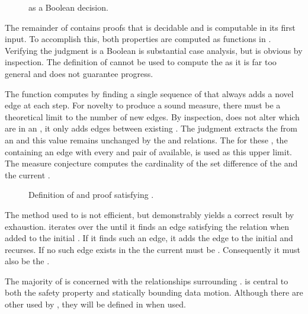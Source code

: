 \begin{figure}
  \COQDOCtransferDec{}
  \caption{\COQtransfer{} as a Boolean decision.}
\end{figure}

The remainder of \COQSequentialAccess{} contains proofs that \COQtransfer{} is decidable and \COQpotAcc{} is computable in its first input.
To accomplish this, both properties are computed as functions in \COQSet{}.
Verifying the \COQtransfer{} judgment is a Boolean is substantial case analysis, but is obvious by inspection.
The definition of \TMpotTransfer{} cannot be used to compute the \TMpotAccAG{} as it is far too general and does not guarantee progress.

The function \COQcomputePotAcc{} computes \TMpotAcc{} by finding a single sequence of \TMtransfers{} that always adds a novel edge at each step.
For novelty to produce a sound measure, there must be a theoretical limit to the number of new edges.
By inspection, \TMtransfer{} does not alter which \TMrefs{} are in an \TMaccessGraph{}, it only adds edges between existing \TMrefs{}.
The \COQagObjsSpec{} judgment extracts the \TMrefs{} from an \TMaccessGraph{} and this value remains unchanged by the \TMtransfer{} and \TMpotTransfer{} relations.
The \TMcompleteAG{} for these \TMrefs{}, the \TMaccessGraph{} containing an edge with every \TMaccessRight{} and pair of \TMrefs{} available, is used as this upper limit.
The measure conjecture \COQdistFromComplete{} computes the cardinality of the set difference of the \TMcompleteAG{} and the current \TMaccessGraph{}.

\begin{figure}
  \COQDOCcomputePotAcc{}
  \COQDOCpotAccPotAccFun{}
  \caption{Definition of \COQcomputePotAcc{} and proof satisfying \COQpotAcc{}.\label{fig:access:computePotAcc}}
\end{figure}

The method used to \TMpotAcc{} is not efficient, but demonstrably yields a correct result by exhaustion.
\COQpotAccFun{} iterates over the \TMcompleteAG{} until it finds an edge satisfying the \COQtransfer{} relation when added to the initial \TMaccessGraph{}.
If it finds such an edge, it adds the edge to the initial \TMaccessGraph{} and recurses.
If no such edge exists in the \TMcompleteAG{} the current \TMaccessGraph{} must be \TMmaximal{}.
Consequently it must also be the \TMpotAccAG{}.

The majority of \TMmodelName{} is concerned with the relationships surrounding \TMpotAcc{}.
\Term{\TMpotAcc} is central to both the safety property and statically bounding data motion.
Although there are other \TMaccessGraphs{} used by \TMmodelName{}, they will be defined in  when used.
